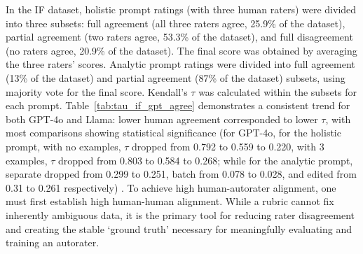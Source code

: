 In the IF dataset, holistic prompt ratings (with three human raters) were divided into three subsets: full agreement (all three raters agree, 25.9\% of the dataset), partial agreement (two raters agree, 53.3\% of the dataset), and full disagreement (no raters agree, 20.9\% of the dataset). The final score was obtained by averaging the three raters' scores. Analytic prompt ratings were divided into full agreement (13\% of the dataset) and partial agreement (87\% of the dataset) subsets, using majority vote for the final score. Kendall's $\tau$ was calculated within the subsets for each prompt. Table~\ref{tab:tau_if_gpt_agree} demonstrates a consistent trend for both GPT-4o and Llama: lower human agreement corresponded to lower $\tau$, with most comparisons showing statistical significance (for GPT-4o, for the holistic prompt, with no examples, $\tau$ dropped from 0.792 to 0.559 to 0.220, with 3 examples, $\tau$ dropped from 0.803 to 0.584 to 0.268; while for the analytic prompt, separate dropped from 0.299 to 0.251, batch from 0.078 to 0.028, and edited from 0.31 to 0.261 respectively) . To achieve high human-autorater alignment, one must first establish high human-human alignment. While a rubric cannot fix inherently ambiguous data, it is the primary tool for reducing rater disagreement and creating the stable ‘ground truth’ necessary for meaningfully evaluating and training an autorater.